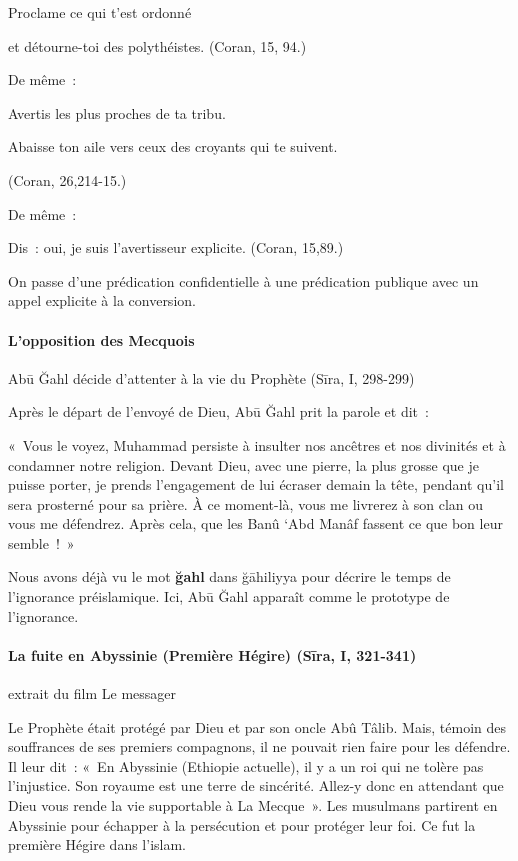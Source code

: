 {Proclame ce qui t'est ordonné}

{et détourne-toi des polythéistes. (Coran, 15, 94.)}

{De même~:}

{Avertis les plus proches de ta tribu.}

{Abaisse ton aile vers ceux des croyants qui te suivent.}

{(Coran, 26,214-15.)}

{De même~:}

{Dis~: oui, je suis l'avertisseur explicite. (Coran, 15,89.)}

On passe d'une prédication confidentielle à une prédication publique
avec un appel explicite à la conversion.


\paragraph{L'opposition des Mecquois
}

Abū Ğahl décide d'attenter à la vie du Prophète (Sīra, I, 298-299)

{Après le départ de l'envoyé de Dieu, Abū Ğahl prit la parole et
dit~:}

{«~Vous le voyez, Muhammad persiste à insulter nos ancêtres et nos
divinités et à condamner notre religion. Devant Dieu, avec une pierre,
la plus grosse que je puisse porter, je prends l'engagement de lui
écraser demain la tête, pendant qu'il sera prosterné pour sa prière. À
ce moment-là, vous me livrerez à son clan ou vous me défendrez. Après
cela, que les Banû `Abd Manâf fassent ce que bon leur semble~!~»}

Nous avons déjà vu le mot \textbf{ğahl} dans ğāhiliyya pour décrire le
temps de l'ignorance préislamique. Ici, Abū Ğahl apparaît comme le
prototype de l'ignorance.


\paragraph{La fuite en Abyssinie (Première Hégire) (Sīra, I,
321-341)}

extrait du film Le messager

Le Prophète était protégé par Dieu et par son oncle Abû Tâlib. Mais,
témoin des souffrances de ses premiers compagnons, il ne pouvait rien
faire pour les défendre. Il leur dit~: {«~En Abyssinie (Ethiopie
actuelle), il y a un roi qui ne tolère pas l'injustice. Son royaume est
une terre de sincérité. Allez-y donc en attendant que Dieu vous rende la
vie supportable à La Mecque~».} Les musulmans partirent en Abyssinie
pour échapper à la persécution et pour protéger leur foi. Ce fut la
première Hégire dans l'islam.

